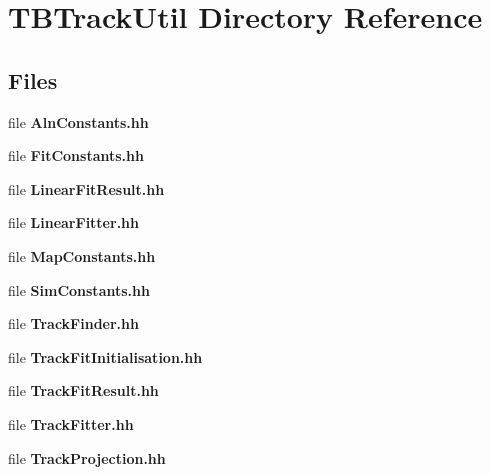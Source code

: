\section{T\-B\-Track\-Util Directory Reference}
\label{dir_48bf9d8ec2921957ac9bec0f5930739c}
\subsection*{Files}
\begin{DoxyCompactItemize}
\item 
file {\bfseries Aln\-Constants.\-hh}
\item 
file {\bfseries Fit\-Constants.\-hh}
\item 
file {\bfseries Linear\-Fit\-Result.\-hh}
\item 
file {\bfseries Linear\-Fitter.\-hh}
\item 
file {\bfseries Map\-Constants.\-hh}
\item 
file {\bfseries Sim\-Constants.\-hh}
\item 
file {\bfseries Track\-Finder.\-hh}
\item 
file {\bfseries Track\-Fit\-Initialisation.\-hh}
\item 
file {\bfseries Track\-Fit\-Result.\-hh}
\item 
file {\bfseries Track\-Fitter.\-hh}
\item 
file {\bfseries Track\-Projection.\-hh}
\end{DoxyCompactItemize}
